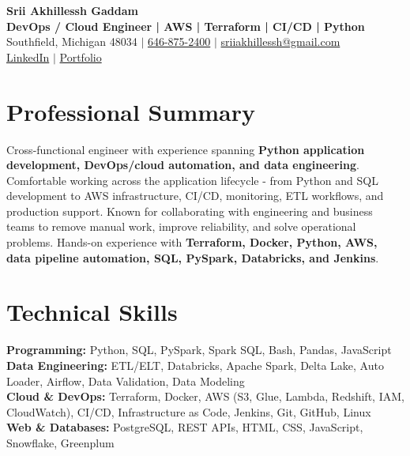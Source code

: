 \documentclass[letterpaper,10pt]{article}
\begin{document}
\fontsize{9.35pt}{10.45pt}\selectfont

\begin{center}
    {\LARGE \textbf{Srii Akhillessh Gaddam}} \\[-1pt]
    \textbf{DevOps / Cloud Engineer | AWS | Terraform | CI/CD | Python} \\[2pt]
    Southfield, Michigan 48034 $|$
    \href{tel:6468752400}{646-875-2400} $|$
    \href{mailto:sriiakhillessh@gmail.com}{sriiakhillessh@gmail.com} \\[1pt]
    \href{https://www.linkedin.com/in/srii-akhiilessh-gaddam-b48668191/}{LinkedIn} $|$
    \href{https://sriiakhillesshg.github.io/portfolio/}{Portfolio}
\end{center}
\vspace{-8pt}

\section{Professional Summary}
\small{Cross-functional engineer with experience spanning \textbf{Python application development, DevOps/cloud automation, and data engineering}. Comfortable working across the application lifecycle - from Python and SQL development to AWS infrastructure, CI/CD, monitoring, ETL workflows, and production support. Known for collaborating with engineering and business teams to remove manual work, improve reliability, and solve operational problems. Hands-on experience with \textbf{Terraform, Docker, Python, AWS, data pipeline automation, SQL, PySpark, Databricks, and Jenkins}.}

\section{Technical Skills}
\small{
\textbf{Programming:} Python, SQL, PySpark, Spark SQL, Bash, Pandas, JavaScript \\
\textbf{Data Engineering:} ETL/ELT, Databricks, Apache Spark, Delta Lake, Auto Loader, Airflow, Data Validation, Data Modeling \\
\textbf{Cloud \& DevOps:} Terraform, Docker, AWS (S3, Glue, Lambda, Redshift, IAM, CloudWatch), CI/CD, Infrastructure as Code, Jenkins, Git, GitHub, Linux \\
\textbf{Web \& Databases:} PostgreSQL, REST APIs, HTML, CSS, JavaScript, Snowflake, Greenplum
}
\end{document}

